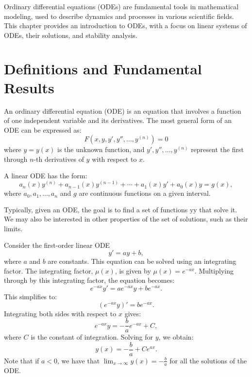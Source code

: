 Ordinary differential equations (ODEs) are fundamental tools in mathematical modeling, used to describe dynamics and processes in various scientific fields. This chapter provides an introduction to ODEs, with a focus on linear systems of ODEs, their solutions, and stability analysis.


\section{Definitions and Fundamental Results}
An ordinary differential equation (ODE) is an equation that involves a function of one independent variable and its derivatives. The most general form of an ODE can be expressed as:
\[
F(x, y, y', y'', \dots, y^{(n)}) = 0
\]
where $ y = y(x) $ is the unknown function, and $ y', y'', \dots, y^{(n)} $ represent the first through $ n $-th derivatives of $ y $ with respect to $ x $.

A linear ODE has the form:
\[
a_n(x) y^{(n)} + a_{n-1}(x) y^{(n-1)} + \cdots + a_1(x) y' + a_0(x) y = g(x),
\]
where $ a_0, a_1, \dots, a_n $ and $ g $ are continuous functions on a given interval.

Typically, given an ODE, the goal is to find a set of functions yy that solve it. We may also be interested in other properties of the set of solutions, such as their limits.

\begin{example}    
Consider the first-order linear ODE
\[
y' = ay + b,
\]
where $ a $ and $ b $ are constants. This equation can be solved using an integrating factor. The integrating factor, $ \mu(x) $, is given by $ \mu(x) = e^{-ax} $. Multiplying through by this integrating factor, the equation becomes:
\[
e^{-ax} y' = ae^{-ax} y + be^{-ax}.
\]
This simplifies to:
\[
(e^{-ax} y)' = be^{-ax}.
\]
Integrating both sides with respect to $ x $ gives:
\[
e^{-ax} y = -\frac{b}{a} e^{-ax} + C,
\]
where $ C $ is the constant of integration. Solving for $ y $, we obtain:
\[
y(x) = -\frac{b}{a} + Ce^{ax}.
\]
Note that if $a<0$, we have that $\lim_{x \to \infty} y(x) = -\frac{b}{a}$ for all the solutions of the ODE.
\end{example} 

